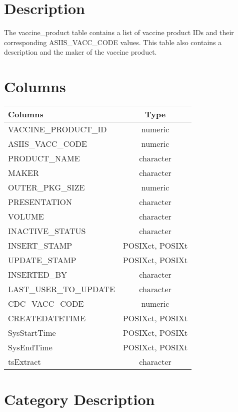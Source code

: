 \documentclass[
  letterpaper,
  DIV=11,
  numbers=noendperiod]{scrreprt}
\begin{document}
\hypertarget{description-49}{%
\section*{Description}\label{description-49}}

The vaccine\_product table contains a list of vaccine product IDs and
their corresponding ASIIS\_VACC\_CODE values. This table also contains a
description and the maker of the vaccine product.

\hypertarget{columns-49}{%
\section*{Columns}\label{columns-49}}

\begin{longtable}{lc}
\toprule
Columns & Type \\ 
\midrule
VACCINE\_PRODUCT\_ID & numeric \\ 
ASIIS\_VACC\_CODE & numeric \\ 
PRODUCT\_NAME & character \\ 
MAKER & character \\ 
OUTER\_PKG\_SIZE & numeric \\ 
PRESENTATION & character \\ 
VOLUME & character \\ 
INACTIVE\_STATUS & character \\ 
INSERT\_STAMP & POSIXct, POSIXt \\ 
UPDATE\_STAMP & POSIXct, POSIXt \\ 
INSERTED\_BY & character \\ 
LAST\_USER\_TO\_UPDATE & character \\ 
CDC\_VACC\_CODE & numeric \\ 
CREATEDATETIME & POSIXct, POSIXt \\ 
SysStartTime & POSIXct, POSIXt \\ 
SysEndTime & POSIXct, POSIXt \\ 
tsExtract & character \\ 
\bottomrule
\end{longtable}

\hypertarget{category-description-49}{%
\section*{Category Description}\label{category-description-49}}
\end{document}
